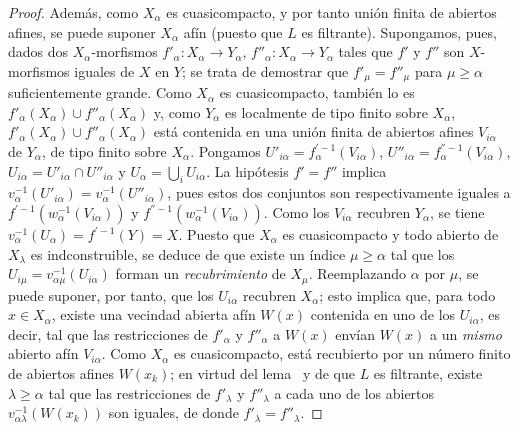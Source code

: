 \begin{proof}
Además, como $X_\alpha$ es cuasicompacto, y por tanto unión finita de abiertos afines, se puede suponer $X_\alpha$ afín (puesto que $L$ es filtrante). Supongamos, pues, dados dos $X_\alpha$-morfismos $f'_\alpha:X_\alpha\to Y_\alpha$, $f''_\alpha:X_\alpha\to Y_\alpha$ tales que $f'$ y $f''$ son $X$-morfismos iguales de $X$ en $Y$; se trata de demostrar que $f'_\mu=f''_\mu$ para $\mu\geq\alpha$ suficientemente grande. Como $X_\alpha$ es cuasicompacto, también lo es $f'_\alpha(X_\alpha)\cup f''_\alpha(X_\alpha)$ y, como $Y_\alpha$ es localmente de tipo finito sobre $X_\alpha$, $f'_\alpha(X_\alpha)\cup f''_\alpha(X_\alpha)$ está contenida en una unión finita de abiertos afines $V_{i\alpha}$ de $Y_\alpha$, de tipo finito sobre $X_\alpha$. Pongamos $U'_{i\alpha}=f_\alpha^{'-1}(V_{i\alpha})$, $U''_{i\alpha}=f_\alpha^{''-1}(V_{i\alpha})$, $U_{i\alpha}=U'_{i\alpha}\cap U''_{i\alpha}$ y $U_\alpha=\bigcup_iU_{i\alpha}$. La hipótesis $f'=f''$ implica $v_\alpha^{-1}(U'_{i\alpha})=v_\alpha^{-1}(U''_{i\alpha})$, pues estos dos conjuntos son respectivamente iguales a $f^{'-1}(w_\alpha^{-1}(V_{i\alpha}))$ y $f^{''-1}(w_\alpha^{-1}(V_{i\alpha}))$. Como los $V_{i\alpha}$ recubren $Y_\alpha$, se tiene $v_\alpha^{-1}(U_\alpha)=f^{'-1}(Y)=X$. Puesto que $X_\alpha$ es cuasicompacto y todo abierto de $X_\lambda$ es indconstruible, se deduce de  que existe un índice $\mu\geq\alpha$ tal que los $U_{i\mu}=v_{\alpha\mu}^{-1}(U_{i\alpha})$ forman un \emph{recubrimiento} de $X_\mu$. Reemplazando $\alpha$ por $\mu$, se puede suponer, por tanto, que los $U_{i\alpha}$ recubren $X_\alpha$; esto implica que, para todo $x\in X_\alpha$, existe una vecindad abierta afín $W(x)$ contenida en uno de los $U_{i\alpha}$, es decir, tal que las restricciones de $f'_\alpha$ y $f''_\alpha$ a $W(x)$ envían $W(x)$ a un \emph{mismo} abierto afín $V_{i\alpha}$. Como $X_\alpha$ es cuasicompacto, está recubierto por un número finito de abiertos afines $W(x_k)$; en virtud del lema~ y de que $L$ es filtrante, existe $\lambda\geq\alpha$ tal que las restricciones de $f'_\lambda$ y $f''_\lambda$ a cada uno de los abiertos $v_{\alpha\lambda}^{-1}(W(x_k))$ son iguales, de donde $f'_\lambda=f''_\lambda$.


\end{proof}
